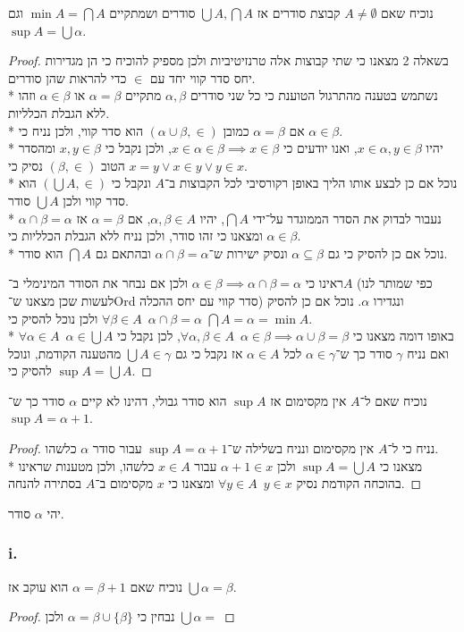 \Question{}
\Subquestion{}
נוכיח שאם $A \ne \emptyset$ קבוצת סודרים אז $\bigcup A, \bigcap A$ סודרים ושמתקיים $\min A = \bigcap A$ וגם $\sup A = \bigcup \alpha$.
\begin{proof}
	בשאלה 2 מצאנו כי שתי קבוצות אלה טרנזיטיביות ולכן מספיק להוכיח כי הן מגדירות יחס סדר קווי יחד עם $\in$ כדי להראות שהן סודרים. \\*
	נשתמש בטענה מהתרגול הטוענת כי כל שני סודרים $\alpha, \beta$ מתקיים $\alpha = \beta$ או $\alpha \in \beta$ וזהו ללא הגבלת הכלליות. \\*
	אם $\alpha = \beta$ כמובן $(\alpha \cup \beta, \in)$ הוא סדר קווי, ולכן נניח כי $\alpha \in \beta$. \\*
	יהיו $x \in \alpha, y \in \beta$, ואנו יודעים כי $x \in \alpha \in \beta \implies x \in \beta$, ולכן נקבל כי $x, y \in \beta$ ומהסדר הטוב $(\beta, \in)$ נסיק כי $x = y \lor x \in y \lor y \in x$. \\*
	נוכל אם כן לבצע אותו הליך באופן רקורסיבי לכל הקבוצות ב־$A$ ונקבל כי $(\bigcup A, \in)$ הוא סדר קווי ולכן $\bigcup A$ סודר. \\*
	נעבור לבדוק את הסדר הממוגדר על־ידי $\bigcap A$, יהיו $\alpha, \beta \in A$, אם $\alpha = \beta$ אז $\alpha \cap \beta = \alpha$ ומצאנו כי זהו סודר, ולכן נניח ללא הגבלת הכלליות כי $\alpha \in \beta$. \\*
	נוכל אם כן להסיק כי גם $\alpha \subseteq \beta$ ונסיק ישירות ש־$\alpha \cap \beta = \alpha$ ובהתאם גם $\bigcap A$ הוא סודר.

	ראינו כי $\alpha \in \beta \implies \alpha \cap \beta = \alpha$ ולכן אם נבחר את הסודר המינימלי ב־$A$ (כפי שמותר לנו לעשות שכן מצאנו ש־Ord סדר קווי עם יחס ההכלה) ונגדירו $\alpha$.
	נוכל אם כן להסיק $\forall \beta \in A \enspace \alpha \cap \beta = \alpha$ ולכן נוכל להסיק כי $\bigcap A = \alpha = \min A$. \\*
	באופו דומה מצאנו כי $\forall \alpha, \beta \in A \enspace \alpha \in \beta \implies \alpha \cup \beta = \beta$,
	לכן נקבל כי $\forall \alpha \in A \enspace \alpha \in \bigcup A$ ואם נניח $\gamma$ סודר כך ש־$\alpha \in \gamma$ לכל $\alpha \in A$ אז נקבל כי גם $\bigcup A \in \gamma$ מהטענה הקודמת, ונוכל להסיק כי $\sup A = \bigcup A$.
\end{proof}

\Subquestion{}
נוכיח שאם ל־$A$ אין מקסימום אז $\sup A$ הוא סודר גבולי, דהינו לא קיים $\alpha$ סודר כך ש־$\sup A = \alpha + 1$.
\begin{proof}
	נניח כי ל־$A$ אין מקסימום ונניח בשלילה ש־$\sup A = \alpha + 1$ עבור סודר $\alpha$ כלשהו. \\*
	מצאנו כי $\sup A = \bigcup A$ ולכן $\alpha + 1 \in x$ עבור $x \in A$ כלשהו, ולכן מטענות שראינו בהוכחה הקודמת נסיק $\forall y \in A \enspace y \in x$ ומצאנו כי $x$ מקסימום ב־$A$ בסתירה להנחה.
\end{proof}

\Question{}
\Subquestion{}
יהי $\alpha$ סודר.

\subsubsection{i.}
נוכיח שאם $\alpha = \beta + 1$ הוא עוקב אז $\bigcup \alpha = \beta$.
\begin{proof}
	נבחין כי $\alpha = \beta \cup \{ \beta \}$ ולכן $\bigcup \alpha = $
\end{proof}


